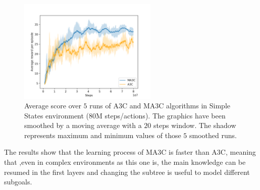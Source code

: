 \begin{figure}[hbtp]
\begin{center}
\includegraphics[width=250]{img/Montezuma_performance.png}
\end{center}
\caption[Montezuma's Revenge performance]
{Average score over $5$ runs of \ac{A3C} and \ac{MA3C} algorithms in Simple States environment (80M steps/actions).
The graphics have been smoothed by a moving average with a $20$ steps window.
The shadow represents maximum and minimum values of those $5$ smoothed runs.}
\label{fig:Montezuma_performance}
\end{figure}

The results show that the learning process of \ac{MA3C} is faster than \ac{A3C}, meaning that ,even in complex environments
as this one is, the main knowledge can be resumed in the first layers and changing the subtree is useful to model different
subgoals.

